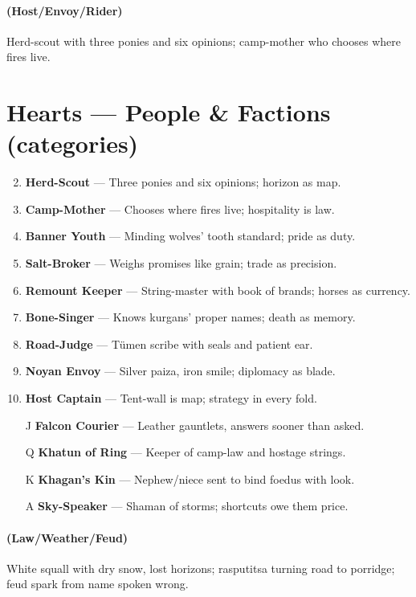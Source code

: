 \paragraph*{(Host/Envoy/Rider)} Herd-scout with three ponies and six opinions; camp-mother who chooses where fires live.

\section*{Hearts --- People \& Factions (categories)}
\label{sec:ykrul-people}
\begin{enumerate}
\setcounter{enumi}{1}
\item \textbf{Herd-Scout} --- Three ponies and six opinions; horizon as map.
\item \textbf{Camp-Mother} --- Chooses where fires live; hospitality is law.
\item \textbf{Banner Youth} --- Minding wolves' tooth standard; pride as duty.
\item \textbf{Salt-Broker} --- Weighs promises like grain; trade as precision.
\item \textbf{Remount Keeper} --- String-master with book of brands; horses as currency.
\item \textbf{Bone-Singer} --- Knows kurgans' proper names; death as memory.
\item \textbf{Road-Judge} --- Tümen scribe with seals and patient ear.
\item \textbf{Noyan Envoy} --- Silver paiza, iron smile; diplomacy as blade.
\item \textbf{Host Captain} --- Tent-wall is map; strategy in every fold.
\item[J] \textbf{Falcon Courier} --- Leather gauntlets, answers sooner than asked.
\item[Q] \textbf{Khatun of Ring} --- Keeper of camp-law and hostage strings.
\item[K] \textbf{Khagan's Kin} --- Nephew/niece sent to bind foedus with look.
\item[A] \textbf{Sky-Speaker} --- Shaman of storms; shortcuts owe them price.
\end{enumerate}

\paragraph*{(Law/Weather/Feud)} White squall with dry snow, lost horizons; rasputitsa turning road to porridge; feud spark from name spoken wrong.

